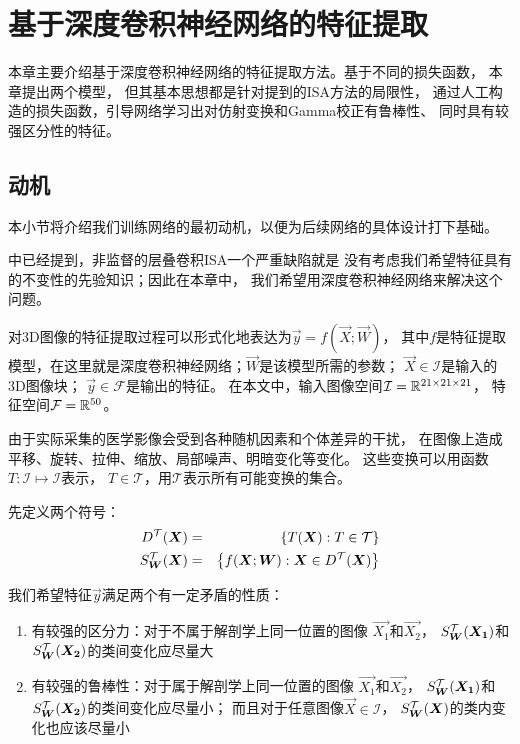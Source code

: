 
\chapter{基于深度卷积神经网络的特征提取\label{chap:CNN}}
本章主要介绍基于深度卷积神经网络的特征提取方法。基于不同的损失函数，
本章提出两个模型，
但其基本思想都是针对提到的ISA方法的局限性，
通过人工构造的损失函数，引导网络学习出对仿射变换和Gamma校正有鲁棒性、
同时具有较强区分性的特征。

\section{动机\label{sec:cnn:motivation}}
本小节将介绍我们训练网络的最初动机，以便为后续网络的具体设计打下基础。

中已经提到，非监督的层叠卷积ISA一个严重缺陷就是
没有考虑我们希望特征具有的不变性的先验知识；因此在本章中，
我们希望用深度卷积神经网络来解决这个问题。

对3D图像的特征提取过程可以形式化地表达为$\vec{y}=f(\vec{X};\vec{W})$，
其中$f$是特征提取模型，在这里就是深度卷积神经网络；$\vec{W}$是该模型所需的参数；
$\vec{X}\in\mathcal{I}$是输入的3D图像块； $\vec{y}\in\mathcal{F}$是输出的特征。
在本文中，输入图像空间$\mathcal{I}=\mathbb{R}^{21\times 21\times 21}$，
特征空间$\mathcal{F}=\mathbb{R}^{50}$。

由于实际采集的医学影像会受到各种随机因素和个体差异的干扰，
在图像上造成平移、旋转、拉伸、缩放、局部噪声、明暗变化等变化。
这些变换可以用函数$T:\mathcal{I}\mapsto\mathcal{I}$表示，
$T\in\mathcal{T}$，用$\mathcal{T}$表示所有可能变换的集合。

先定义两个符号：
\begin{eqnarray}
    D^{\mathcal{T}}(\boldsymbol{X}) &=& \left\{T(\boldsymbol{X}): T\in\mathcal{T}\right\} \nonumber \\
    S_{\boldsymbol{W}}^{\mathcal{T}}(\boldsymbol{X}) &=& \left\{f(\boldsymbol{X};\boldsymbol{W}):
    \boldsymbol{X}\in D^{\mathcal{T}}(\boldsymbol{X})\right\} \label{eqn:cnn:augdef}
\end{eqnarray}

我们希望特征$\vec{y}$满足两个有一定矛盾的性质：
\begin{enumerate}
    \item 有较强的区分力：对于不属于解剖学上同一位置的图像
        $\vec{X_1}$和$\vec{X_2}$，
        $S_{\boldsymbol{W}}^{\mathcal{T}}(\boldsymbol{X_1})$和$S_{\boldsymbol{W}}^{\mathcal{T}}(\boldsymbol{X_2})$的类间变化应尽量大
    \item 有较强的鲁棒性：对于属于解剖学上同一位置的图像
        $\vec{X_1}$和$\vec{X_2}$，
        $S_{\boldsymbol{W}}^{\mathcal{T}}(\boldsymbol{X_1})$和$S_{\boldsymbol{W}}^{\mathcal{T}}(\boldsymbol{X_2})$的类间变化应尽量小；
        而且对于任意图像$\vec{X}\in\mathcal{I}$，
        $S_{\boldsymbol{W}}^{\mathcal{T}}(\boldsymbol{X})$的类内变化也应该尽量小
\end{enumerate}

